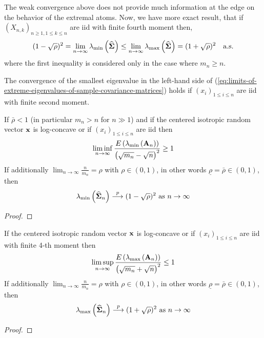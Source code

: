 The weak convergence above does not provide much information at the edge on the behavior of the extremal atoms. Now, we have more exact result, that if \(\left(X_{n,k}\right)_{n\geq 1,1\leq k\leq n}\) are iid with finite fourth moment then,
\begin{equation} \label{eq:limits-of-extreme-eigenvalues-of-sample-covariance-matrices}
	(1-\sqrt{\rho})^{2}=\lim_{n\rightarrow\infty}\lambda_{\min}\left(\widehat{\boldsymbol{\Sigma}}\right)\leq\lim_{n\rightarrow\infty}\lambda_{\max}\left(\widehat{\boldsymbol{\Sigma}}\right)=(1+\sqrt{\rho})^{2}\quad\text{a.s.}
\end{equation}
where the first inequality is considered only in the case where \(m_{n}\geq n\).

\begin{remark}
	The convergence of the smallest eigenvalue in the left-hand side of (\ref{eq:limits-of-extreme-eigenvalues-of-sample-covariance-matrices}) holds if \(\left(x_{i}\right)_{1\leq i\leq n}\) are iid with finite second moment.
\end{remark}

\begin{theorem}
	If \(\bar{\rho}<1\) (in particular \(m_{n}>n\) for \(n\gg 1\)) and if the centered isotropic random vector \(\mathbf{x}\) is log-concave or if \(\left(x_{i}\right)_{1\leq i\leq n}\) are iid then
	\begin{equation}
		\liminf_{n\rightarrow\infty}\frac{E\left(\lambda_{\min}\left(\mathbf{A}_{n}\right)\right)}{\left(\sqrt{m_{n}}-\sqrt{n}\right)^{2}}\geq 1
	\end{equation}
	If additionally \(\lim_{n\rightarrow\infty}\frac{n}{m_{n}}=\rho\) with \(\rho \in(0,1)\), in other words \(\underline{\rho}=\bar{\rho}\in(0,1)\), then
	\begin{equation}
		\lambda_{\min}\left(\widehat{\bfSigma}_{n}\right)\stackrel{p}{\longrightarrow}(1-\sqrt{\rho})^{2}\ \text{as}\ n\rightarrow\infty
	\end{equation}
\end{theorem}

\begin{proof}

\end{proof}

\begin{theorem}
	If the centered isotropic random vector \(\mathbf{x}\) is log-concave or if \(\left(x_{i}\right)_{1\leq i\leq n}\) are iid with finite 4-th moment then
	\begin{equation}
		\limsup_{n\rightarrow\infty}\frac{E\left(\lambda_{\max}\left(\mathbf{A}_{n}\right)\right)}{\left(\sqrt{m_{n}}+\sqrt{n}\right)^{2}}\leq 1
	\end{equation}
	If additionally \(\lim_{n\rightarrow\infty}\frac{n}{m_{n}}=\rho\) with \(\rho \in(0,1)\), in other words \(\underline{\rho}=\bar{\rho}\in(0,1)\), then
	\begin{equation}
		\lambda_{\max}\left(\widehat{\bfSigma}_{n}\right)\stackrel{p}{\longrightarrow}(1+\sqrt{\rho})^{2}\ \text{as}\ n\rightarrow\infty
	\end{equation}
\end{theorem}

\begin{proof}

\end{proof}
